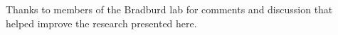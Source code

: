 Thanks to members of the Bradburd lab for comments and discussion that
helped improve the research presented here.